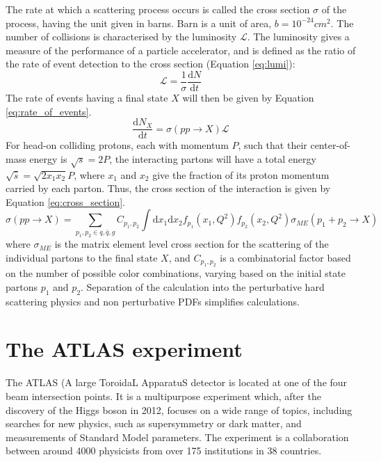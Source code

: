 \documentclass[12pt,a4paper,openright,twoside]{report}
\begin{document}
The rate at which a scattering process occurs is called the cross section $\sigma$ of the process, having the unit given in barns. Barn is a unit of area, $b = 10^{-24}cm^2$. The number of collisions is characterised by the luminosity $\mathcal{L}$. The luminosity gives a measure of the performance of a particle accelerator, and is defined as the ratio of the rate of event detection to the cross section (Equation \ref{eq:lumi}):
\begin{equation}
\mathcal{L} = \frac{1}{\sigma}\frac{\text{d}N}{\text{d}t}
\label{eq:lumi}
\end{equation}
The rate of events having a final state $X$ will then be given by Equation \ref{eq:rate_of_events}.
\begin{equation}
\frac{\text{d}N_X}{\text{d}t} = \sigma(pp\to X)\mathcal{L}
\label{eq:rate_of_events}
\end{equation}
For head-on colliding protons, each with momentum $P$, such that their center-of-mass energy is $\sqrt{s}=2P$, the interacting partons will have a total energy $\sqrt{\hat{s}}=\sqrt{2x_1x_2}P$, where $x_1$ and $x_2$ give the fraction of its proton momentum carried by each parton. Thus, the cross section of the interaction is given by Equation \ref{eq:cross_section}.
\begin{equation}
\sigma(pp\to X) = \sum_{p_1,p_2\in q,\bar{q},g} C_{p_1,p_2}\int\text{d}x_1\text{d}x_2 f_{p_1}(x_1,Q^2)f_{p_2}(x_2,Q^2)\sigma_{ME}(p_1+p_2\to X)
\label{eq:cross_section}
\end{equation}
where $\sigma_{ME}$ is the matrix element level cross section for the scattering of the individual partons to the final state $X$, and $C_{p_1,p_2}$ is a combinatorial factor based on the number of possible color combinations, varying based on the initial state partons $p_1$ and $p_2$. Separation of the calculation into the perturbative hard scattering physics and non perturbative PDFs simplifies calculations.

\section{The ATLAS experiment}
The ATLAS (A large ToroidaL ApparatuS detector is located at one of the four beam intersection points. It is a multipurpose experiment which, after the discovery of the Higgs boson in 2012, focuses on a wide range of topics, including searches for new physics, such as supersymmetry or dark matter, and measurements of Standard Model parameters. The experiment is a collaboration between around 4000 physicists from over 175 institutions in 38 countries.
\end{document}
